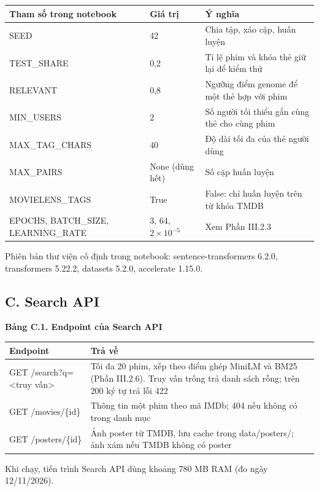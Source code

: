\documentclass[12pt,a4paper]{article}
\newcommand{\np}{\Needspace{8\baselineskip}}
\let\oldsubsection\subsection
\renewcommand{\subsection}{\Needspace{12\baselineskip}\oldsubsection}
\begin{document}
{\def\LTcaptype{}\small
\begin{longtable}[]{@{}*{3}{P{(\linewidth - 4\tabcolsep) * }}@{}}
\toprule
\textbf{Tham số trong notebook} & \textbf{Giá trị} & \textbf{Ý nghĩa} \\
\midrule
\endhead
\bottomrule
\endlastfoot
SEED & 42 & Chia tập, xáo cặp, huấn luyện \\
TEST\_SHARE & 0,2 & Tỉ lệ phim và khóa thẻ giữ lại để kiểm thử \\
RELEVANT & 0,8 & Ngưỡng điểm genome để một thẻ hợp với phim \\
MIN\_USERS & 2 & Số người tối thiểu gắn cùng thẻ cho cùng phim \\
MAX\_TAG\_CHARS & 40 & Độ dài tối đa của thẻ người dùng \\
MAX\_PAIRS & None (dùng hết) & Số cặp huấn luyện \\
MOVIELENS\_TAGS & True & False: chỉ huấn luyện trên từ khóa TMDB \\
EPOCHS, BATCH\_SIZE, LEARNING\_RATE & 3, 64, $2\times 10^{-5}$ & Xem Phần III.2.3 \\
\end{longtable}
}

Phiên bản thư viện cố định trong notebook: sentence-transformers 6.2.0, transformers 5.22.2, datasets 5.2.0, accelerate 1.15.0.

\subsection{C. Search API}

\np\textbf{Bảng C.1. Endpoint của Search API}

{\def\LTcaptype{}\small
\begin{longtable}[]{@{}*{2}{P{(\linewidth - 2\tabcolsep) * }}@{}}
\toprule
\textbf{Endpoint} & \textbf{Trả về} \\
\midrule
\endhead
\bottomrule
\endlastfoot
GET /search?q=\textless truy vấn\textgreater{} & Tối đa 20 phim, xếp theo điểm ghép MiniLM và BM25 (Phần III.2.6). Truy vấn trống trả danh sách rỗng; trên 200 ký tự trả lỗi 422 \\
GET /movies/\{id\} & Thông tin một phim theo mã IMDb; 404 nếu không có trong danh mục \\
GET /posters/\{id\} & Ảnh poster từ TMDB, lưu cache trong data/posters/; ảnh xám nếu TMDB không có poster \\
\end{longtable}
}

Khi chạy, tiến trình Search API dùng khoảng 780 MB RAM (đo ngày 12/11/2026).
\end{document}
